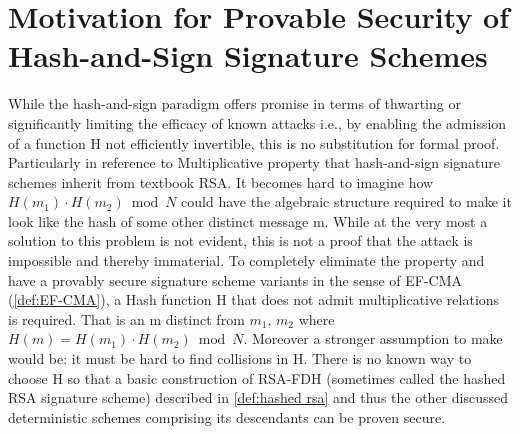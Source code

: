 \documentclass[]{final_report}
\theoremstyle{definition}
\begin{document}
\section{Motivation for Provable Security of Hash-and-Sign Signature Schemes}
While the hash-and-sign paradigm offers promise in terms of thwarting or significantly limiting the efficacy of known attacks i.e., by enabling the admission of a function H not efficiently invertible, this is no substitution for formal proof. Particularly in reference to Multiplicative property that hash-and-sign signature schemes inherit from textbook RSA. 
It becomes hard to imagine how $H(m_{1}) \cdot H(m_{2}) \bmod N$ could have the algebraic structure required to make it look like the hash of some other distinct message m. While at the very most a solution to this problem is not evident, this is not a proof that the attack is impossible and thereby immaterial. 
To completely eliminate the property and have a provably secure signature scheme variants in the sense of EF-CMA (\ref{def:EF-CMA}), a Hash function H that does not admit multiplicative relations is required. That is an m distinct from $m_{1}$, $m_{2}$ where $H(m) = H(m_{1}) \cdot H(m_{2}) \bmod N$. Moreover a stronger assumption to make would be: it must be hard to find collisions in H. There is no known way to choose H so that a basic construction of RSA-FDH (sometimes called the hashed RSA signature scheme) described in \ref{def:hashed rsa} and thus the other discussed deterministic schemes comprising its descendants can be proven secure.
\end{document}

